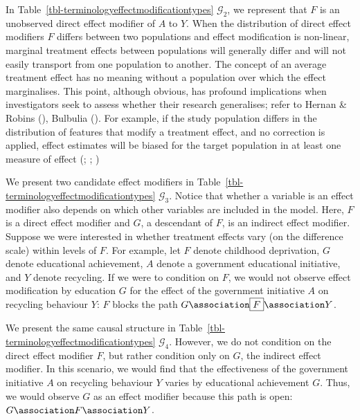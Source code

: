 \documentclass[
  single column]{article}
\begin{document}
In Table~\ref{tbl-terminologyeffectmodificationtypes} \(\mathcal{G}_2\),
we represent that \(F\) is an unobserved direct effect modifier of \(A\)
to \(Y\). When the distribution of direct effect modifiers \(F\) differs
between two populations and effect modification is non-linear, marginal
treatment effects between populations will generally differ and will not
easily transport from one population to another. The concept of an
average treatment effect has no meaning without a population over which
the effect marginalises. This point, although obvious, has profound
implications when investigators seek to assess whether their research
generalises; refer to Hernan \& Robins
(), Bulbulia
(). For example, if the study
population differs in the distribution of features that modify a
treatment effect, and no correction is applied, effect estimates will be
biased for the target population in at least one measure of effect
(;
;
)

We present two candidate effect modifiers in
Table~\ref{tbl-terminologyeffectmodificationtypes} \(\mathcal{G}_3\).
Notice that whether a variable is an effect modifier also depends on
which other variables are included in the model. Here, \(F\) is a direct
effect modifier and \(G\), a descendant of \(F\), is an indirect effect
modifier. Suppose we were interested in whether treatment effects vary
(on the difference scale) within levels of \(F\). For example, let \(F\)
denote childhood deprivation, \(G\) denote educational achievement,
\(A\) denote a government educational initiative, and \(Y\) denote
recycling. If we were to condition on \(F\), we would not observe effect
modification by education \(G\) for the effect of the government
initiative \(A\) on recycling behaviour \(Y\): \(\boxed{F}\) blocks the
path \(G \association \boxed{F} \association Y\).

We present the same causal structure in
Table~\ref{tbl-terminologyeffectmodificationtypes} \(\mathcal{G}_4\).
However, we do not condition on the direct effect modifier \(F\), but
rather condition only on \(G\), the indirect effect modifier. In this
scenario, we would find that the effectiveness of the government
initiative \(A\) on recycling behaviour \(Y\) varies by educational
achievement \(G\). Thus, we would observe \(G\) as an effect modifier
because this path is open: \(G \association F \association Y\).
\end{document}
